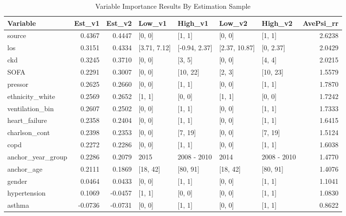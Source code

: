 \begin{table}[ht]
\centering
\caption{Variable Importance Results By Estimation Sample} 
\label{byFold}
\begin{tabular}{lrrllllr}
  \hline
Variable & Est\_v1 & Est\_v2 & Low\_v1 & High\_v1 & Low\_v2 & High\_v2 & AvePsi\_rr \\ 
  \hline
source & 0.4367 & 0.4447 & [0, 0] & [1, 1] & [0, 0] & [1, 1] & 2.6238 \\ 
  los & 0.3151 & 0.4334 & [3.71, 7.12] & [-0.94, 2.37] & [2.37, 10.87] & [0, 2.37] & 2.0429 \\ 
  ckd & 0.3245 & 0.3710 & [0, 0] & [3, 5] & [0, 0] & [4, 4] & 2.0215 \\ 
  SOFA & 0.2291 & 0.3007 & [0, 0] & [10, 22] & [2, 3] & [10, 23] & 1.5579 \\ 
  pressor & 0.2625 & 0.2660 & [0, 0] & [1, 1] & [0, 0] & [1, 1] & 1.7870 \\ 
  ethnicity\_white & 0.2569 & 0.2652 & [1, 1] & [0, 0] & [1, 1] & [0, 0] & 1.7242 \\ 
  ventilation\_bin & 0.2607 & 0.2502 & [0, 0] & [1, 1] & [0, 0] & [1, 1] & 1.7333 \\ 
  heart\_failure & 0.2358 & 0.2404 & [0, 0] & [1, 1] & [0, 0] & [1, 1] & 1.6415 \\ 
  charlson\_cont & 0.2398 & 0.2353 & [0, 0] & [7, 19] & [0, 0] & [7, 19] & 1.5124 \\ 
  copd & 0.2272 & 0.2286 & [0, 0] & [1, 1] & [0, 0] & [1, 1] & 1.6038 \\ 
  anchor\_year\_group & 0.2286 & 0.2079 & 2015 & 2008 - 2010 & 2014 & 2008 - 2010 & 1.4770 \\ 
  anchor\_age & 0.2111 & 0.1869 & [18, 42] & [80, 91] & [18, 42] & [80, 91] & 1.4076 \\ 
  gender & 0.0464 & 0.0433 & [0, 0] & [1, 1] & [0, 0] & [1, 1] & 1.1041 \\ 
  hypertension & 0.1069 & -0.0457 & [1, 1] & [0, 0] & [0, 0] & [1, 1] & 1.0830 \\ 
  asthma & -0.0736 & -0.0731 & [0, 0] & [1, 1] & [0, 0] & [1, 1] & 0.8622 \\ 
   \hline
\end{tabular}
\end{table}
